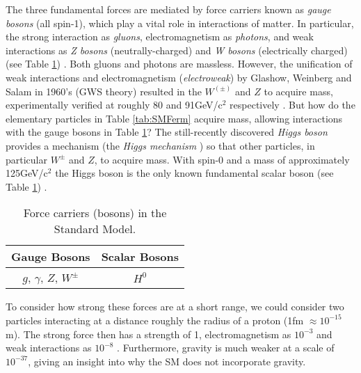 The three fundamental forces are mediated by force carriers known as \textit{gauge bosons} (all spin-1), which play a vital role in interactions of matter. In particular, the strong interaction as \textit{gluons}, electromagnetism as \textit{photons}, and weak interactions as \textit{Z bosons} (neutrally-charged) and \textit{W bosons} (electrically charged) (see Table \ref{tab:SMBos}) \cite{griffiths2008introduction}. Both gluons and photons are massless. However, the unification of weak interactions and electromagnetism (\textit{electroweak}) by Glashow, Weinberg and Salam in 1960's (GWS theory) \cite{glashow1961partial, weinberg1967model, salam1968elementary} resulted in the $W^{(\pm)}$ and $Z$ to acquire mass, experimentally verified at roughly 80 and 91GeV/c$^2$ respectively \cite{griffiths2008introduction, tanabashi2018review}. But how do the elementary particles in Table \ref{tab:SMFerm} acquire mass, allowing interactions with the gauge bosons in Table \ref{tab:SMBos}? The still-recently discovered \textit{Higgs boson} provides a mechanism (the \textit{Higgs mechanism} \cite{higgs1964broken, englert1964broken}) so that other particles, in particular $W^{\pm}$ and $Z$, to acquire mass. With spin-0 and a mass of approximately 125GeV/c$^2$ \cite{tanabashi2018review} the  Higgs boson is the only known fundamental scalar boson (see Table \ref{tab:SMBos}) \cite{griffiths2008introduction}. \\

\begin{table}[htbp]
    \centering
    \begin{tabular}{||c|c||}
    \hline
       Gauge Bosons  & Scalar Bosons \\
     \hline
       $g$, $\gamma$, $Z$, $W^\pm$ & $H^0$ \\
     \hline
    \end{tabular}
    \caption{Force carriers (bosons) in the Standard Model.}
    \label{tab:SMBos}
\end{table}

To consider how strong these forces are at a short range, we could  consider two particles interacting at a distance roughly the radius of a proton (1fm $\approx 10^{-15}$m). The strong force then has a strength of 1, electromagnetism as $10^{-3}$ and weak interactions as $10^{-8}$ \cite{thomson2013modern}. Furthermore, gravity is much weaker at a scale of $10^{-37}$, giving an insight into why the SM does not incorporate gravity. \\


